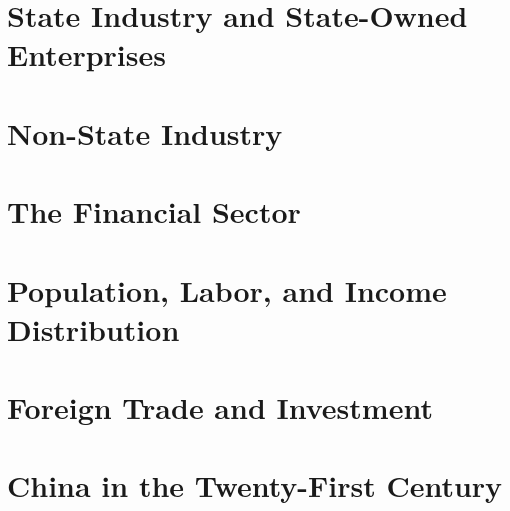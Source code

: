 \documentclass[11pt]{article}
\theoremstyle{definition}
\theoremstyle{remark}
\begin{document}
\section{State Industry and State-Owned Enterprises}

\section{Non-State Industry}

\section{The Financial Sector}

\section{Population, Labor, and Income Distribution}

\section{Foreign Trade and Investment}

\section{China in the Twenty-First Century}
\end{document}
